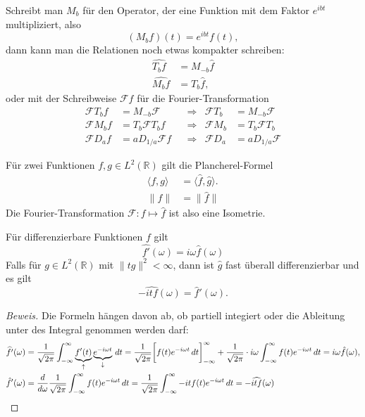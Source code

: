 Schreibt man $M_b$ für den Operator, der eine Funktion mit dem
Faktor $e^{ibt}$ multipliziert, also
\[
(M_bf)(t) = e^{ibt}f(t),
\]
dann kann man die Relationen noch etwas kompakter schreiben:
\begin{align*}
\widehat{T_bf}
&=
M_{-b}\hat{f}
\\
\widehat{M_bf}
&=
T_b\hat{f},
\end{align*}
oder mit der Schreibweise $\mathcal{F}f$ für die Fourier-Transformation
\[
\begin{aligned}
\mathcal{F}T_b f &= M_{-b}\mathcal F
&&\Rightarrow &
\mathcal{F}T_b &= M_{-b}\mathcal{F}
\\
\mathcal{F}M_b f&=T_b\mathcal{F}T_bf
&&\Rightarrow &
\mathcal{F}M_b&=T_b\mathcal{F}T_b
\\
\mathcal{F}D_af&=a D_{1/a} \mathcal F f
&&\Rightarrow &
\mathcal{F}D_a&=a D_{1/a} \mathcal F 
\end{aligned}
\]

\begin{satz}
Für zwei Funktionen $f,g\in L^2(\mathbb R)$ gilt die Plancherel-Formel
\begin{align*}
\langle f,g\rangle
&=
\langle \hat{f},\hat{g}\rangle.
\\
\|f\|&=\|\hat{f}\|
\end{align*}
Die Fourier-Transformation $\mathcal{F}\colon f\mapsto \hat{f}$ ist
also eine Isometrie.
\end{satz}

\begin{satz}
Für differenzierbare Funktionen $f$ gilt
\[
\widehat{f'}(\omega) = i\omega \hat{f}(\omega)
\]
Falls für $g\in L^2(\mathbb R)$ mit $\|tg\|^2<\infty$, dann ist $\hat{g}$
fast überall differenzierbar und es gilt
\[
-\widehat{i t f}(\omega) = \hat{f}'(\omega).
\]
\end{satz}

\begin{proof}[Beweis]
Die Formeln hängen davon ab, ob partiell integiert oder die Ableitung
unter des Integral genommen werden darf:
\begin{align*}
\widehat{f'}(\omega)
&=
\frac{1}{\sqrt{2\pi}}
\int_{-\infty}^\infty \underbrace{f'(t)}_{\uparrow}\underbrace{e^{-i\omega t}}_{\downarrow}\,dt
=
\frac{1}{\sqrt{2\pi}}
\biggl[
f(t)e^{-i\omega t}\,dt
\biggr]_{-\infty}^\infty
+
\frac{1}{\sqrt{2\pi}}
\cdot
i\omega
\int_{-\infty}^\infty f(t)e^{-i\omega t}\,dt
=
i\omega\hat{f}(\omega),
\\
\hat{f}'(\omega)
&=
\frac{d}{d\omega}
\frac{1}{\sqrt{2\pi}} \int_{-\infty}^\infty
f(t) e^{-i\omega t}\,dt
=
\frac{1}{\sqrt{2\pi}} \int_{-\infty}^\infty
-it f(t) e^{-i\omega t}\,dt
=
-\widehat{itf}(\omega)
\qedhere
\end{align*}
\end{proof}

